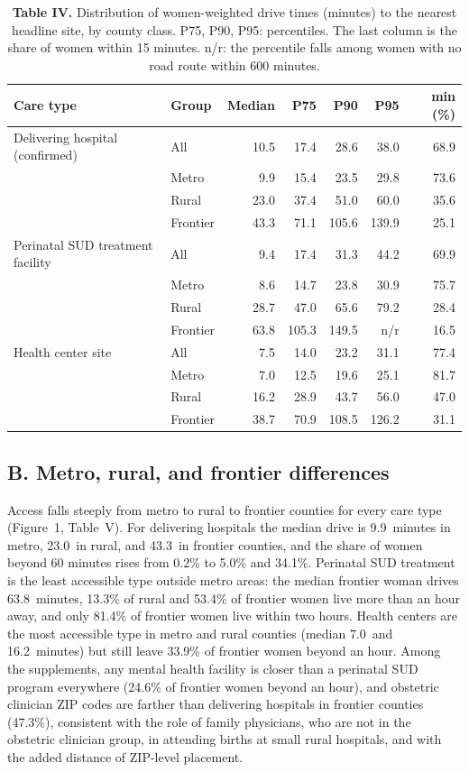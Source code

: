 \documentclass{article}
\begin{document}
\begin{table}
\centering\caption{\textbf{Table IV.} Distribution of women-weighted drive times (minutes) to the nearest headline site, by county class. P75, P90, P95: percentiles. The last column is the share of women within 15 minutes. n/r: the percentile falls among women with no road route within 600 minutes.}
\begin{tabular}{@{}llrrrrr@{}}
\toprule
Care type & Group & Median & P75 & P90 & P95 & \le15 min (\%) \\
\midrule
Delivering hospital (confirmed) & All & 10.5 & 17.4 & 28.6 & 38.0 & 68.9 \\
 & Metro & 9.9 & 15.4 & 23.5 & 29.8 & 73.6 \\
 & Rural & 23.0 & 37.4 & 51.0 & 60.0 & 35.6 \\
 & Frontier & 43.3 & 71.1 & 105.6 & 139.9 & 25.1 \\

Perinatal SUD treatment facility & All & 9.4 & 17.4 & 31.3 & 44.2 & 69.9 \\
 & Metro & 8.6 & 14.7 & 23.8 & 30.9 & 75.7 \\
 & Rural & 28.7 & 47.0 & 65.6 & 79.2 & 28.4 \\
 & Frontier & 63.8 & 105.3 & 149.5 & n/r & 16.5 \\

Health center site & All & 7.5 & 14.0 & 23.2 & 31.1 & 77.4 \\
 & Metro & 7.0 & 12.5 & 19.6 & 25.1 & 81.7 \\
 & Rural & 16.2 & 28.9 & 43.7 & 56.0 & 47.0 \\
 & Frontier & 38.7 & 70.9 & 108.5 & 126.2 & 31.1 \\
\bottomrule
\end{tabular}

\end{table}

\subsection*{B. Metro, rural, and frontier differences}
Access falls steeply from metro to rural to frontier counties for every care type (Figure~1, Table~V). For delivering hospitals the median drive is 9.9\ minutes in metro, 23.0\ in rural, and 43.3\ in frontier counties, and the share of women beyond 60 minutes rises from 0.2\% to 5.0\% and 34.1\%. Perinatal SUD treatment is the least accessible type outside metro areas: the median frontier woman drives 63.8\ minutes, 13.3\% of rural and 53.4\% of frontier women live more than an hour away, and only 81.4\% of frontier women live within two hours. Health centers are the most accessible type in metro and rural counties (median 7.0\ and 16.2\ minutes) but still leave 33.9\% of frontier women beyond an hour. Among the supplements, any mental health facility is closer than a perinatal SUD program everywhere (24.6\% of frontier women beyond an hour), and obstetric clinician ZIP codes are farther than delivering hospitals in frontier counties (47.3\%), consistent with the role of family physicians, who are not in the obstetric clinician group, in attending births at small rural hospitals, and with the added distance of ZIP-level placement.
\end{document}
